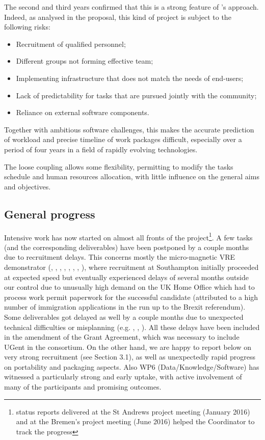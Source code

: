 \documentclass{deliverablereport}
\begin{document}
The second and third years confirmed that this is a strong feature of \ODK's
approach. Indeed, as analysed in the proposal, this kind of project is
subject to the following risks:
\begin{itemize}
\item Recruitment of qualified personnel;
\item Different groups not forming effective team;
\item Implementing infrastructure that does not match the needs of end-users;
\item Lack of predictability for tasks that are pursued jointly with
  the community;
\item Reliance on external software components.
\end{itemize}
Together with ambitious software challenges, this makes the accurate
prediction of workload and precise timeline of work packages
difficult, especially over a period of four years in a field of
rapidly evolving technologies.

The loose coupling allows some flexibility,
permitting to modify the tasks schedule and human resources allocation,
with little influence on the general aims and objectives.

\subsection{General progress}

Intensive work has now started on almost all fronts of the
project\footnote{status reports delivered at the St Andrews project
  meeting (January 2016) and at the Bremen's project meeting (June
  2016) helped the Coordinator to track the progress}. A few tasks
(and the corresponding deliverables) have been postponed by a couple
months due to recruitment delays. This concerns mostly the
micro-magnetic VRE demonstrator
(,
,
,
,
,
,
,
), where recruitment
at Southampton initially proceeded at expected speed but eventually
experienced delays of several months outside our control due to unusually high demand on the UK Home
Office which had to process work permit paperwork for
the successful candidate (attributed to a high number of immigration applications in the run up to the
Brexit referendum). Some deliverables got
delayed as well by a couple months due to unexpected technical
difficulties or misplanning (e.g. ,
, ). All
these delays have been included in the amendment of the Grant
Agreement, which was necessary to include UGent in the
consortium. On the other hand, we are happy to report below on very
strong recruitment (see Section 3.1), as well as unexpectedly rapid
progress on portability and packaging aspects. Also WP6
(Data/Knowledge/Software) has witnessed a particularly strong and
early uptake, with active involvement of many of the participants and
promising outcomes.
\end{document}
